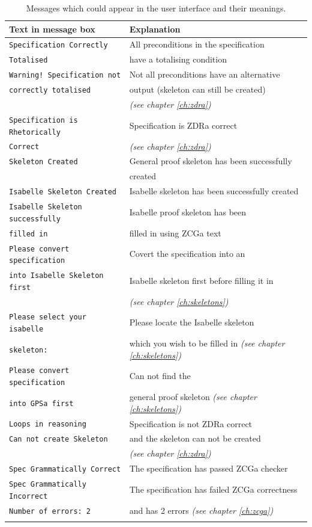 {\def\arraystretch{0.5}\tabcolsep=0.5pt
\begin{longtable}[H]{|l | l |}
\hline
\textbf{Text in message box} & \textbf{Explanation} \\
\hline
\hline
\verb|Specification Correctly| & All preconditions in the specification\\
\verb|Totalised| & have a totalising condition  \\
\hline
\verb|Warning! Specification not| & Not all preconditions have an alternative \\
\verb|correctly totalised| & output (skeleton can still be created) \\
& \textit{(see chapter \ref{ch:zdra})} \\
\hline
\verb|Specification is Rhetorically| & Specification is ZDRa correct \\
\verb|Correct| & \textit{(see chapter \ref{ch:zdra})} \\
\hline
\verb|Skeleton Created| & General proof skeleton has been successfully \\
& created \\
\hline
\verb|Isabelle Skeleton Created| & Isabelle skeleton has been successfully
created \\
\hline
\verb|Isabelle Skeleton successfully| & Isabelle proof skeleton has been \\
\verb|filled in| & filled in using ZCGa text \\
\hline
\verb|Please convert specification| & Covert the specification into an  \\
\verb|into Isabelle Skeleton first| & Isabelle skeleton first before filling it
in \\
& \textit{(see chapter \ref{ch:skeletons})} \\
\hline
\verb|Please select your isabelle| & Please locate the Isabelle skeleton\\
\verb|skeleton:| & which you wish to be filled in \textit{(see chapter
\ref{ch:skeletons})}\\
\hline
\verb|Please convert specification| & Can not find the \\
\verb|into GPSa first| & general proof skeleton \textit{(see chapter
\ref{ch:skeletons})}\\
\hline
\verb|Loops in reasoning| & Specification is not ZDRa correct \\
\verb|Can not create Skeleton| & and the skeleton can not be created \\
& \textit{(see chapter \ref{ch:zdra})}\\
\hline
\verb|Spec Grammatically Correct| & The specification has passed ZCGa checker \\
\hline
\verb|Spec Grammatically Incorrect|& The specification has failed ZCGa
correctness\\
\verb|Number of errors: 2| & and has 2 errors \textit{(see chapter
\ref{ch:zcga})}\\
\hline 
\caption{Messages which could appear in the user interface and their meanings.}
\label{tab:uimessages}
\end{longtable}
}

